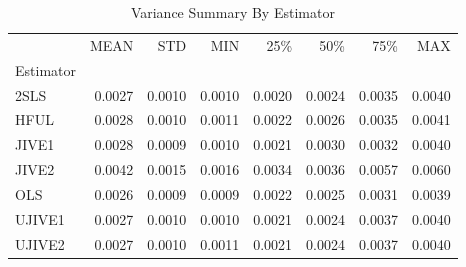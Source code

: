\begin{table}[ht]
\centering
\caption{Variance Summary By Estimator}
\begin{tabular}{lrrrrrrr}
\toprule
 & MEAN & STD & MIN & 25\% & 50\% & 75\% & MAX \\
Estimator &  &  &  &  &  &  &  \\
\midrule
2SLS & 0.0027 & 0.0010 & 0.0010 & 0.0020 & 0.0024 & 0.0035 & 0.0040 \\
HFUL & 0.0028 & 0.0010 & 0.0011 & 0.0022 & 0.0026 & 0.0035 & 0.0041 \\
JIVE1 & 0.0028 & 0.0009 & 0.0010 & 0.0021 & 0.0030 & 0.0032 & 0.0040 \\
JIVE2 & 0.0042 & 0.0015 & 0.0016 & 0.0034 & 0.0036 & 0.0057 & 0.0060 \\
OLS & 0.0026 & 0.0009 & 0.0009 & 0.0022 & 0.0025 & 0.0031 & 0.0039 \\
UJIVE1 & 0.0027 & 0.0010 & 0.0010 & 0.0021 & 0.0024 & 0.0037 & 0.0040 \\
UJIVE2 & 0.0027 & 0.0010 & 0.0011 & 0.0021 & 0.0024 & 0.0037 & 0.0040 \\
\bottomrule
\end{tabular}
\end{table}
